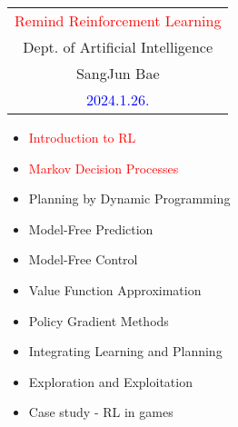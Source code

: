\documentclass[landscape]{article}
\def\tcr{\textcolor{red}}
\def\tcb{\textcolor{blue}}
\begin{document}
\sf

\newvgempty \bigskip \begin{center} \mbox{}

\vspace{1.2in} \Large

 
\vspace{2cm} \begin{tabular}{c}
\huge  \tcr{Remind Reinforcement Learning}\\
[1em] \huge  Dept. of Artificial Intelligence  \\
[1em] \huge  SangJun Bae \\
[3em] \LARGE \tcb{2024.1.26.}
\end{tabular}

\end{center}

\renewcommand{\baselinestretch}{1.2}

\newpage
\newvgtitle{\tcb{Lecture Outline}}
\LARGE
\vspace{-.5em}
\begin{itemize}
    \item  \tcr{Introduction to RL}
    \item  \tcr{Markov Decision Processes}
    \item  Planning by Dynamic Programming
    \item  Model-Free Prediction
    \item  Model-Free Control
    \item  Value Function Approximation
    \item  Policy Gradient Methods
    \item  Integrating Learning and Planning
    \item  Exploration and Exploitation
    \item  Case study - RL in games
\end{itemize}
\end{document}
